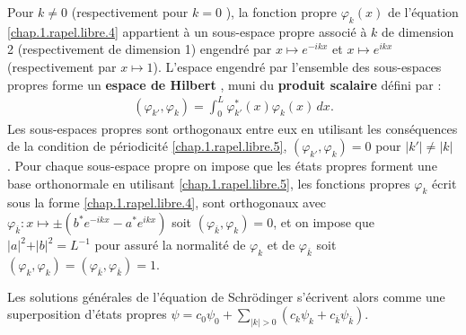\medskip

Pour $k \neq 0 $ (respectivement pour $k = 0$ ), la fonction propre $\varphi_k(x)$ de l’équation \eqref{chap.1.rapel.libre.4} appartient à un sous-espace propre associé à $k$ de dimension 2 (respectivement de dimension 1) engendré par $x \mapsto e^{-ikx}$ et $x \mapsto e^{ikx}$ (respectivement par $x \mapsto 1$).
L’espace engendré par l’ensemble des sous-espaces propres forme un {\bf espace de Hilbert} , muni du {\bf produit scalaire} défini par :
\begin{eqnarray}
	( \varphi_{k'} , \varphi_{k} ) = \int_0^L \varphi_{k'}^\ast(x) \varphi_{k}(x) \, dx .\label{chap.1.rapel.libre.5}
\end{eqnarray}
Les sous-espaces propres sont orthogonaux entre eux \ie en utilisant les conséquences de la condition de périodicité \eqref{chap.1.rapel.libre.5}, $( \varphi_{k'} , \varphi_{k} ) = 0$ pour $\vert k' \vert \neq \vert k \vert  $ . 
Pour chaque sous-espace propre on impose que les états propres forment une base orthonormale \ie en utilisant \eqref{chap.1.rapel.libre.5}, les fonctions propres $\varphi_{k}$ écrit sous la forme \eqref{chap.1.rapel.libre.4}, sont orthogonaux avec $\varphi_{\overline{k}} \colon x \mapsto \pm ( b^\ast e^{-ikx} - a^\ast e^{ikx} )$  soit $(\varphi_{\overline{k}} , \varphi_{k} ) = 0$, et on impose que  $ \vert a \vert^2 + \vert b \vert^2 = L^{-1}$ pour assuré la normalité  de $\varphi_{k}$  et de $\varphi_{\overline{k}}$ soit  $( \varphi_{k} , \varphi_{k} ) = (\varphi_{\overline{k}} , \varphi_{\overline{k}})   = 1$. 

\medskip

Les solutions générales de l’équation de Schrödinger s’écrivent alors comme une superposition d’états propres  $\psi = c_0 \psi_0 +  \sum_{\vert k \vert > 0 } (c_k \psi_k  + c_{\overline{k}} \psi_{\overline{k}}) $. 

